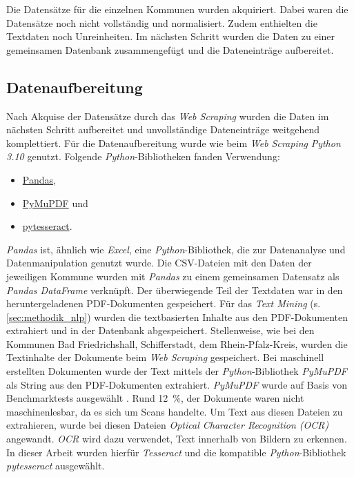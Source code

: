 Die Datensätze für die einzelnen Kommunen wurden akquiriert. Dabei waren die Datensätze noch nicht vollständig und normalisiert. Zudem enthielten die Textdaten noch Unreinheiten. Im nächsten Schritt wurden die Daten zu einer gemeinsamen Datenbank zusammengefügt und die Dateneinträge aufbereitet.

\nocite{gemeindehassloch, kreisbaddurkheim, kreisbergstrassea, kreisfreiestadtfrankenthal, kreisfreiestadtlandau, kreisfreiestadtspeyer, kreisgermersheim, kreisheilbronn, rhein-neckar-kreis, rhein-pfalz-kreis, saarpfalz-kreis, stadtbaddurkheim, stadtbadfriedrichshall, stadtbadrappenau, stadtbensheim, stadtheppenheim, stadthockenheim, stadthomburg, stadtlampertheim, stadtleimen, stadtprimasens, stadtschifferstadt, stadtschwetzingen, stadtviernheim, stadtweinheim, stadtwiesloch, stadtworthamrhein}

\subsection{Datenaufbereitung}\label{sec:datenaufbereitung}

Nach Akquise der Datensätze durch das \textit{Web Scraping} wurden die Daten im nächsten Schritt aufbereitet und unvollständige Dateneinträge weitgehend komplettiert. Für die Datenaufbereitung wurde wie beim \textit{Web Scraping} \textit{Python 3.10} genutzt. Folgende \textit{Python}-Bibliotheken fanden Verwendung:

\begin{itemize}
    \item \href{https://pandas.pydata.org/}{Pandas},
    \item \href{https://github.com/pymupdf/PyMuPDF}{PyMuPDF} und
    \item \href{https://github.com/madmaze/pytesseract}{pytesseract}.
\end{itemize}

\textit{Pandas} ist, ähnlich wie \textit{Excel}, eine \textit{Python}-Bibliothek, die zur Datenanalyse und Datenmanipulation genutzt wurde. Die CSV-Dateien mit den Daten der jeweiligen Kommune wurden mit \textit{Pandas} zu einem gemeinsamen Datensatz als \textit{Pandas DataFrame} verknüpft. Der überwiegende Teil der Textdaten war in den heruntergeladenen PDF-Dokumenten gespeichert. Für das \textit{Text Mining} (s. \autoref{sec:methodik_nlp}) wurden die textbasierten Inhalte aus den PDF-Dokumenten extrahiert und in der Datenbank abgespeichert. Stellenweise, wie bei den Kommunen Bad Friedrichshall, Schifferstadt, dem Rhein-Pfalz-Kreis, wurden die Textinhalte der Dokumente beim \textit{Web Scraping} gespeichert. Bei maschinell erstellten Dokumenten wurde der Text mittels der \textit{Python}-Bibliothek \textit{PyMuPDF} als String aus den PDF-Dokumenten extrahiert. \textit{PyMuPDF} wurde auf Basis von Benchmarktests ausgewählt \parencite{thoma2023}. Rund 12~\%, der Dokumente waren nicht maschinenlesbar, da es sich um Scans handelte. Um Text aus diesen Dateien zu extrahieren, wurde bei diesen Dateien \textit{Optical Character Recognition (OCR)} angewandt. \textit{OCR} wird dazu verwendet, Text innerhalb von Bildern zu erkennen. In dieser Arbeit wurden hierfür \textit{Tesseract} \parencite{smith2007} und die kompatible \textit{Python}-Bibliothek \textit{pytesseract} ausgewählt.


